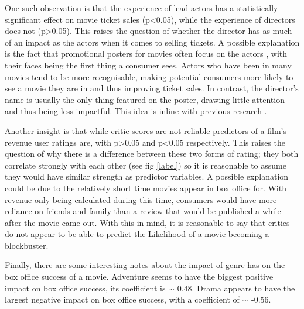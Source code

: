             One such observation is that the experience of lead actors has a statistically
                significant effect on movie ticket sales (p<0.05), while the experience of
                directors does not (p>0.05).
            This raises the question of whether the director has as much of an impact as
                the actors when it comes to selling tickets.
            A possible explanation is the fact that promotional posters for movies often
                focus on the actors \cite{label}, with their faces being the first thing a
                consumer sees.
            Actors who have been in many movies tend to be more recognisable, making
                potential consumers more likely to see a movie they are in and thus improving
                ticket sales.
            In contrast, the director's name is usually the only thing featured on the
                poster, drawing little attention and thus being less impactful.
            This idea is inline with previous research \cite{label}.

            Another insight is that while critic scores are not reliable predictors of a
                film's revenue user ratings are, with p>0.05 and p<0.05 respectively.
            This raises the question of why there is a difference between these two forms
                of rating; they both correlate strongly with each other (see fig \ref{label})
                so it is reasonable to assume they would have similar strength as predictor
                variables.
            A possible explanation could be due to the relatively short time movies appear
                in box office for.
            With revenue only being calculated during this time, consumers would have more
                reliance on friends and family than a review that would be published a while
                after the movie came out.
            With this in mind, it is reasonable to say that critics do not appear to be
                able to predict the Likelihood of a movie becoming a blockbuster.

            Finally, there are some interesting notes about the impact of genre has on the
                box office success of a movie.
            Adventure seems to have the biggest positive impact on box office success, its
                coefficient is $\sim$ 0.48.
            Drama appears to have the largest negative impact on box office success, with a
                coefficient of $\sim$ -0.56.

